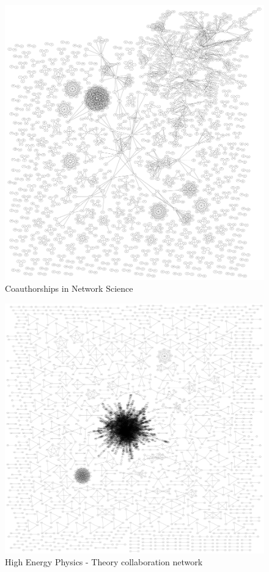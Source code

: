 \documentclass[addpoints]{exam}
\begin{document}
\begin{figure}
  \centering
  \includegraphics[width=\textwidth]{netsci}
  \caption{Coauthorships in Network Science}
  \label{fig:netsci}
\end{figure}

\begin{figure}
  \centering
  \includegraphics[width=\textwidth]{hep}
  \caption{High Energy Physics - Theory collaboration network}
  \label{fig:hep}
\end{figure}
\end{document}
